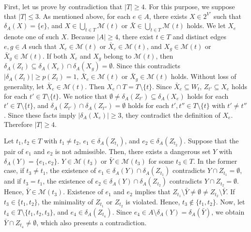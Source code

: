 \documentclass{article}
\newcommand{\Mfam}{\mathcal{M}}
\begin{document}
First, let us prove by contradiction that $|T|\geq 4$.
For this purpose, we suppose that $|T| \leq 3$.
As mentioned above, for each $e \in A$, there exists
$X \in 2^{V'}$ such that $\delta_A(X)=\{e\}$, and $X \in \bigcup_{t \in T}\Mfam(t)$
or $\bar{X} \in \bigcup_{t \in T}\Mfam(t)$ holds.
We let $X_e$ denote one of such $X$.
Because $|A|\geq 4$,
there exist $t \in T$ and distinct edges $e,g \in A$
such that $X_{e} \in \Mfam(t)$ or $\bar{X}_{e} \in \Mfam(t)$, and
$X_{g} \in \Mfam(t)$ or $\bar{X}_{g} \in \Mfam(t)$.
If both $X_{e}$ and $X_{g}$  belong to $\Mfam(t)$,
then $\delta_A(Z_{t}) \subseteq \delta_A(X_{e}) \cap
\delta_A(X_{g})= \emptyset$. Since this contradicts $|\delta_A(Z_t)|
\geq p(Z_t)=1$, 
$\bar{X}_{e} \in \Mfam(t)$ or $\bar{X}_{g} \in \Mfam(t)$ holds.
Without loss of generality, let
$\bar{X}_{e} \in \Mfam(t)$.
Then $X_{e} \cap T = T \setminus \{t\}$.
Since $\bar{X}_{e} \subseteq W_t$,
$Z_{t'} \subseteq X_{e}$ holds for each $t' \in T\setminus \{t\}$.
We notice that $\emptyset \neq \delta_A(Z_{t'}) \subseteq \delta_{A}(X_{e})$
holds for each $t' \in T\setminus \{t\}$,
and $\delta_A(Z_{t'}) \cap \delta_A(Z_{t''})=\emptyset$ holds for each
$t',t'' \in T\setminus \{t\}$ with $t' \neq t''$.
Since these facts imply $|\delta_{A}(X_{e})| \geq 3$,
they contradict the definition of $X_e$.
Therefore $|T|\geq 4$.

Let $t_1,t_2 \in T$ with $t_1\neq t_2$, $e_1 \in \delta_A(Z_{t_1})$, and
$e_2 \in \delta_A(Z_{t_2})$.
Suppose that the pair of $e_1$ and $e_2$ is not admissible.
Then, there exists a dangerous set $Y$ with $\delta_A(Y)=\{e_1,e_2\}$.
$Y \in \Mfam(t_3)$  or $\bar{Y} \in \Mfam(t_3)$ for some $t_3 \in T$.
In the former case,
if $t_3 \neq t_1$,
the existence of $e_1 \in \delta_A(Y)\cap \delta_A(Z_{t_1})$
contradicts $Y \cap Z_{t_1} = \emptyset$,
and 
if $t_3 = t_1$,
the 
existence of $e_2 \in \delta_A(Y)\cap \delta_A(Z_{t_2})$
contradicts $Y \cap Z_{t_2} = \emptyset$.
Hence,
$\bar{Y} \in \Mfam(t_3)$.
Existence of $e_1$ and $e_2$ implies that 
$Z_{t_1} \setminus \bar{Y} \neq \emptyset \neq Z_{t_2} \setminus \bar{Y}$.
If $t_3 \in \{t_1,t_2\}$, the minimality of $Z_{t_1}$ or $Z_{t_2}$ is violated.
Hence, $t_3 \not\in \{t_1,t_2\}$. Now, let $t_4 \in T \setminus \{t_1,t_2,t_3\}$,
and $e_4 \in \delta_A(Z_{t_4})$.
Since
$e_4 \in A \setminus \delta_{A}(Y)=\delta_A(\bar{Y})$, 
we obtain $\bar{Y}\cap Z_{t_4} \neq \emptyset$, which also presents a contradiction.
\end{document}

